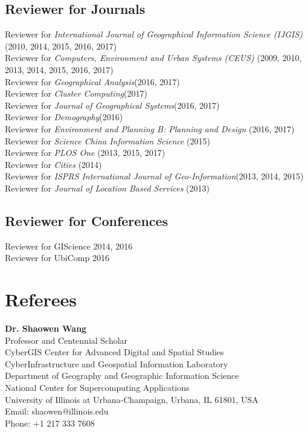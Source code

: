 \documentclass[11pt, a4paper]{article}
\begin{document}
\subsection*{Reviewer for Journals}
Reviewer for \emph{International Journal of Geographical Information Science (IJGIS)} (2010, 2014, 2015, 2016, 2017)\\
Reviewer for \emph{Computers, Environment and Urban Systems (CEUS)} (2009, 2010, 2013, 2014, 2015, 2016, 2017)\\
Reviewer for \emph{Geographical Analysis}(2016, 2017)\\
Reviewer for \emph{Cluster Computing}(2017)\\
Reviewer for \emph{Journal of Geographical Systems}(2016, 2017)\\
Reviewer for \emph{Demography}(2016)\\
Reviewer for \emph{Environment and Planning B: Planning and Design} (2016, 2017)\\
Reviewer for \emph{Science China Information Science} (2015)\\
Reviewer for \emph{PLOS One} (2013, 2015, 2017)\\
Reviewer for \emph{Cities} (2014)\\
Reviewer for \emph{ISPRS International Journal of Geo-Information}(2013, 2014, 2015)\\
Reviewer for \emph{Journal of Location Based Services} (2013)
\subsection*{Reviewer for Conferences}
Reviewer for GIScience {2014, 2016}\\
Reviewer for UbiComp {2016}

\section*{Referees}
\noindent
\textbf{Dr. Shaowen Wang}\\
Professor and Centennial Scholar\\
CyberGIS Center for Advanced Digital and Spatial Studies\\
CyberInfrastructure and Geospatial Information Laboratory\\
Department of Geography and Geographic Information Science\\
National Center for Supercomputing Applications\\
University of Illinois at Urbana-Champaign, Urbana, IL 61801, USA\\
Email: shaowen@illinois.edu\\
Phone: +1 217 333 7608\\
\end{document}
